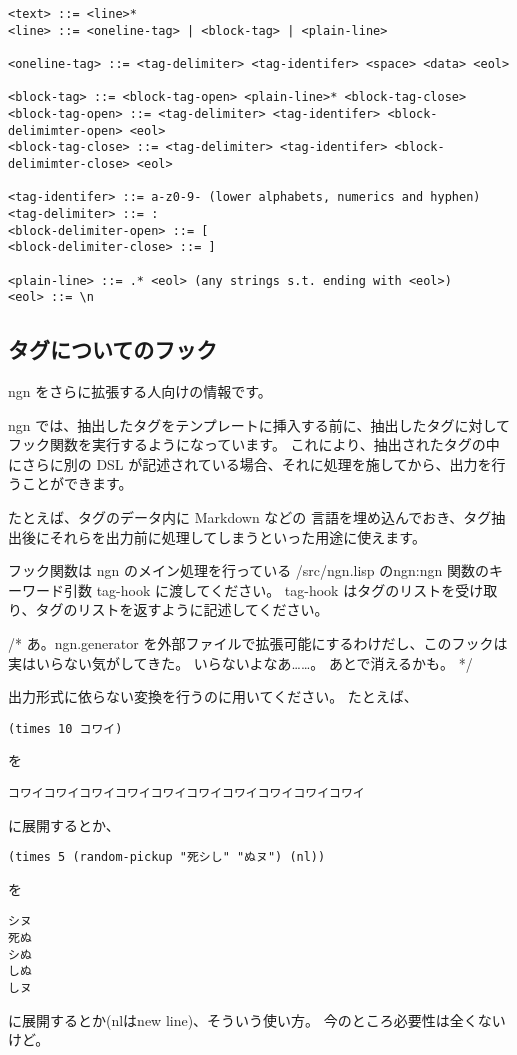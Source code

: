 \documentclass[a4j]{jsarticle}
\begin{document}
\begin{lstlisting}[caption=タグ付きテキストファイル]
<text> ::= <line>*
<line> ::= <oneline-tag> | <block-tag> | <plain-line>

<oneline-tag> ::= <tag-delimiter> <tag-identifer> <space> <data> <eol>

<block-tag> ::= <block-tag-open> <plain-line>* <block-tag-close>
<block-tag-open> ::= <tag-delimiter> <tag-identifer> <block-delimimter-open> <eol>
<block-tag-close> ::= <tag-delimiter> <tag-identifer> <block-delimimter-close> <eol>
  
<tag-identifer> ::= a-z0-9- (lower alphabets, numerics and hyphen)  
<tag-delimiter> ::= :
<block-delimiter-open> ::= [
<block-delimiter-close> ::= ]

<plain-line> ::= .* <eol> (any strings s.t. ending with <eol>)  
<eol> ::= \n
\end{lstlisting}


\subsection{タグについてのフック}
ngn をさらに拡張する人向けの情報です。

ngn では、抽出したタグをテンプレートに挿入する前に、抽出したタグに対してフック関数を実行するようになっています。
これにより、抽出されたタグの中にさらに別の DSL が記述されている場合、それに処理を施してから、出力を行うことができます。

たとえば、タグのデータ内に Markdown などの 言語を埋め込んでおき、タグ抽出後にそれらを出力前に処理してしまうといった用途に使えます。

フック関数は ngn のメイン処理を行っている /src/ngn.lisp のngn:ngn 関数のキーワード引数 tag-hook に渡してください。
tag-hook はタグのリストを受け取り、タグのリストを返すように記述してください。

/* 
あ。ngn.generator を外部ファイルで拡張可能にするわけだし、このフックは実はいらない気がしてきた。
いらないよなあ……。
あとで消えるかも。
 */

出力形式に依らない変換を行うのに用いてください。
たとえば、
\begin{lstlisting}
(times 10 コワイ)
\end{lstlisting}
を
\begin{lstlisting}
コワイコワイコワイコワイコワイコワイコワイコワイコワイコワイ
\end{lstlisting}
に展開するとか、
\begin{lstlisting}
(times 5 (random-pickup "死シし" "ぬヌ") (nl))
\end{lstlisting}
を
\begin{lstlisting}
シヌ
死ぬ
シぬ
しぬ
しヌ
\end{lstlisting}
に展開するとか(nlはnew line)、そういう使い方。
今のところ必要性は全くないけど。
\end{document}
